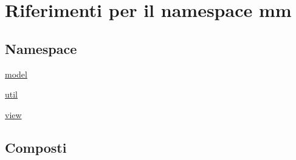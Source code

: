 \hypertarget{namespacemm}{}\section{Riferimenti per il namespace mm}
\label{namespacemm}
\subsection*{Namespace}
\begin{DoxyCompactItemize}
\item 
 \mbox{\hyperlink{namespacemm_1_1model}{model}}
\item 
 \mbox{\hyperlink{namespacemm_1_1util}{util}}
\item 
 \mbox{\hyperlink{namespacemm_1_1view}{view}}
\end{DoxyCompactItemize}
\subsection*{Composti}
